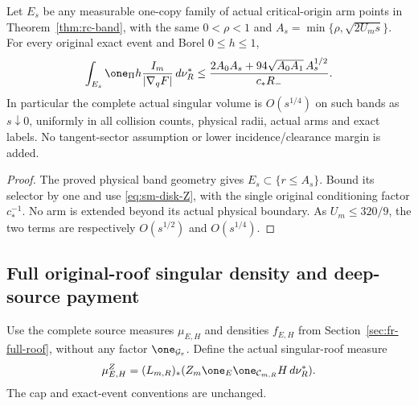 \begin{corollary}
\label{cor:sm-critical-band}
Let $E_s$ be any measurable one-copy family of actual critical-origin
arm points in Theorem~\ref{thm:rc-band}, with the same $0<\rho<1$
and $A_s=\min\{\rho,\sqrt{2U_m s}\}$.
For every original exact event and Borel $0\le h\le1$,
\begin{equation}\label{eq:sm-critical-band}
 \int_{E_s}\one_\Pi h\frac{I_m}{|\nabla_qF|}\,d\nu_R^*
 \le\frac{2A_0A_s+94\sqrt{A_0A_1}\,A_s^{1/2}}
                 {c_*R_-}.
\end{equation}
In particular the complete actual singular volume is $O(s^{1/4})$
on such bands as $s\downarrow0$, uniformly in all collision counts,
physical radii, actual arms and exact labels.  No tangent-sector
assumption or lower incidence/clearance margin is added.
\end{corollary}
\begin{proof}
The proved physical band geometry gives $E_s\subset\{r\le A_s\}$.
Bound its selector by one and use \eqref{eq:sm-disk-Z}, with the
single original conditioning factor $c_*^{-1}$.  No arm is extended
beyond its actual physical boundary.  As $U_m\le320/9$, the two
terms are respectively $O(s^{1/2})$ and $O(s^{1/4})$.
\end{proof}

\subsection{Full original-roof singular density and deep-source payment}
Use the complete source measures $\mu_{E,H}$ and densities
$f_{E,H}$ from Section~\ref{sec:fr-full-roof}, without any
factor $\one_{\mathcal G_\varepsilon}$.  Define the actual
singular-roof measure
\begin{equation}\label{eq:sm-roof-measure}
 \mu^Z_{E,H}=(L_{m,R})_*
       (Z_m\one_E\one_{\mathcal C_{m,R}}H\,d\nu_R^*).
\end{equation}
The cap and exact-event conventions are unchanged.


